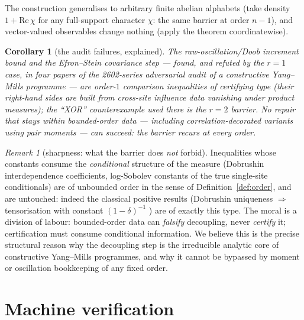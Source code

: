 \documentclass[11pt]{article}
\newtheorem{corollary}{Corollary}
\theoremstyle{remark}
\newtheorem{remark}{Remark}
\begin{document}
The construction generalises to arbitrary finite abelian alphabets
(take density $1 + \mathrm{Re}\,\chi$ for any full-support character
$\chi$: the same barrier at order $n-1$), and vector-valued
observables change nothing (apply the theorem coordinatewise).

\begin{corollary}[the audit failures, explained]
\label{cor:audit}
The raw-oscillation/Doob increment bound and the Efron--Stein
covariance step --- found, and refuted by the $r=1$ case, in four
papers of the 2602-series adversarial audit of a constructive
Yang--Mills programme \cite{series} --- are order-$1$ comparison
inequalities of certifying type (their right-hand sides are built
from cross-site influence data vanishing under product measures);
the ``XOR'' counterexample used there is the $r=2$ barrier. No repair that stays within bounded-order data ---
including correlation-decorated variants using pair moments --- can
succeed: the barrier recurs at every order.
\end{corollary}

\begin{remark}[sharpness: what the barrier does \emph{not} forbid]
\label{rem:scope}
Inequalities whose constants consume the \emph{conditional} structure
of the measure (Dobrushin interdependence coefficients, log-Sobolev
constants of the true single-site conditionals) are of unbounded
order in the sense of Definition~\ref{def:order}, and are untouched:
indeed the classical positive results (Dobrushin uniqueness
$\Rightarrow$ tensorisation with constant $(1-\delta)^{-1}$
\cite{Dob}) are of exactly this type. The moral is a division of
labour: bounded-order data can \emph{falsify} decoupling, never
\emph{certify} it; certification must consume conditional
information. We believe this is the precise structural reason why
the decoupling step is the irreducible analytic core of constructive
Yang--Mills programmes, and why it cannot be bypassed by moment or
oscillation bookkeeping of any fixed order.
\end{remark}

\section{Machine verification}
\end{document}
